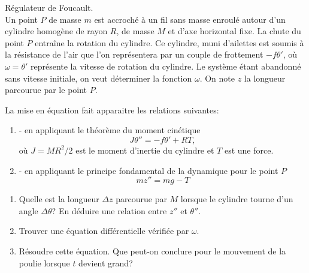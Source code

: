 
\begin{exercice}\label{exoEqsDiff0011}


Régulateur de Foucault.\\
Un point $P$ de masse $m$ est accroché à un fil sans masse enroulé autour d'un cylindre homogène de rayon $R$, de masse $M$ et d'axe horizontal fixe. La chute du point $P$  entraîne la rotation du cylindre. Ce cylindre, muni d'ailettes est soumis à la résistance de l'air que l'on représentera par un couple de frottement $-f\theta'$, où $\omega = \theta'$ représente la vitesse de rotation du cylindre. Le système étant abandonné sans vitesse initiale, on veut déterminer la fonction $\omega$. On note $z$ la longueur parcourue par le point $P$.

La mise en équation fait apparaitre les relations suivantes:
\begin{enumerate}
\item - en appliquant le théorème du moment cinétique
\[
	J\theta''=-f\theta'+RT,
\]
où $J=MR^2/2$ est le moment d'inertie du cylindre et $T$ est une force.
\item - en appliquant le principe fondamental de la dynamique pour le point $P$
\[
mz''=mg-T
\]
\end{enumerate}
\begin{enumerate}
\item Quelle est la longueur $\Delta z$ parcourue par $M$ lorsque le cylindre tourne  d'un angle $\Delta \theta$? En déduire une relation entre $z''$ et $\theta''$.
\item Trouver une équation différentielle vérifiée par $\omega$.
\item Résoudre cette équation. Que peut-on conclure pour le mouvement de la poulie lorsque $t$ devient grand?
\end{enumerate}

\end{exercice}
